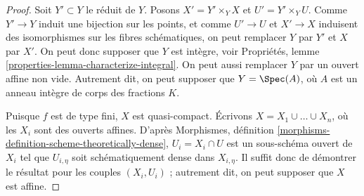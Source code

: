 \begin{proof}
Soit $Y' \subset Y$ le réduit de $Y$.
Posons $X' = Y' \times_Y X$ et $U' = Y' \times_Y U$.
Comme $Y' \to Y$ induit une bijection sur les points, et comme
$U' \to U$ et $X' \to X$ induisent des isomorphismes sur les fibres schématiques,
on peut remplacer $Y$ par $Y'$ et $X$ par $X'$.
On peut donc supposer que $Y$ est intègre, voir
Propriétés, lemme \ref{properties-lemma-characterize-integral}.
On peut aussi remplacer $Y$ par un ouvert affine non vide. Autrement dit, on
peut supposer que $Y = \Spec(A)$, où $A$ est un anneau intègre de corps des
fractions $K$.

\medskip\noindent
Puisque $f$ est de type fini, $X$ est quasi-compact.
Écrivons $X = X_1 \cup \ldots \cup X_n$, où les $X_i$ sont des ouverts affines. D'après
Morphismes, définition \ref{morphisms-definition-scheme-theoretically-dense},
$U_i = X_i \cap U$ est un sous-schéma ouvert de $X_i$ tel que
$U_{i, \eta}$ soit schématiquement dense dans $X_{i, \eta}$.
Il suffit donc de démontrer le résultat pour les couples $(X_i, U_i)$ ;
autrement dit, on peut supposer que $X$ est affine.


\end{proof}
